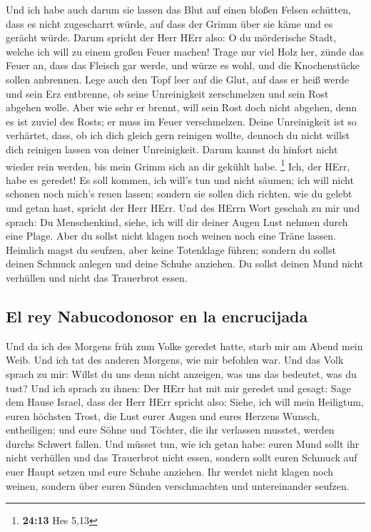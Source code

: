  Und ich habe auch darum sie lassen das Blut auf einen
bloßen Felsen schütten, dass es nicht zugescharrt würde, auf dass der
Grimm über sie käme und es gerächt würde.  Darum spricht
der Herr HErr also: O du mörderische Stadt, welche ich will zu einem
großen Feuer machen!  Trage nur viel Holz her, zünde das
Feuer an, dass das Fleisch gar werde, und würze es wohl, und die
Knochenstücke sollen anbrennen.  Lege auch den Topf leer
auf die Glut, auf dass er heiß werde und sein Erz entbrenne, ob seine
Unreinigkeit zerschmelzen und sein Rost abgehen wolle. 
Aber wie sehr er brennt, will sein Rost doch nicht abgehen, denn es ist
zuviel des Rosts; er muss im Feuer verschmelzen.  Deine
Unreinigkeit ist so verhärtet, dass, ob ich dich gleich gern reinigen
wollte, dennoch du nicht willst dich reinigen lassen von deiner
Unreinigkeit. Darum kannst du hinfort nicht wieder rein werden, bis mein
Grimm sich an dir gekühlt habe. \footnote{\textbf{24:13} Hes 5,13}
 Ich, der HErr, habe es geredet! Es soll kommen, ich
will's tun und nicht säumen; ich will nicht schonen noch mich's reuen
lassen; sondern sie sollen dich richten, wie du gelebt und getan hast,
spricht der Herr HErr.  Und des HErrn Wort geschah zu mir
und sprach:  Du Menschenkind, siehe, ich will dir deiner
Augen Lust nehmen durch eine Plage. Aber du sollst nicht klagen noch
weinen noch eine Träne lassen.  Heimlich magst du
seufzen, aber keine Totenklage führen; sondern du sollst deinen Schmuck
anlegen und deine Schuhe anziehen. Du sollst deinen Mund nicht verhüllen
und nicht das Trauerbrot essen.

\hypertarget{el-rey-nabucodonosor-en-la-encrucijada}{%
\subsection{El rey Nabucodonosor en la
encrucijada}\label{el-rey-nabucodonosor-en-la-encrucijada}}

 Und da ich des Morgens früh zum Volke geredet hatte,
starb mir am Abend mein Weib. Und ich tat des anderen Morgens, wie mir
befohlen war.  Und das Volk sprach zu mir: Willst du uns
denn nicht anzeigen, was uns das bedeutet, was du tust? 
Und ich sprach zu ihnen: Der HErr hat mit mir geredet und gesagt:
 Sage dem Hause Israel, dass der Herr HErr spricht also:
Siehe, ich will mein Heiligtum, euren höchsten Trost, die Lust eurer
Augen und eures Herzens Wunsch, entheiligen; und eure Söhne und Töchter,
die ihr verlassen musstet, werden durchs Schwert fallen. 
Und müsset tun, wie ich getan habe: euren Mund sollt ihr nicht verhüllen
und das Trauerbrot nicht essen,  sondern sollt euren
Schmuck auf euer Haupt setzen und eure Schuhe anziehen. Ihr werdet nicht
klagen noch weinen, sondern über euren Sünden verschmachten und
untereinander seufzen.

